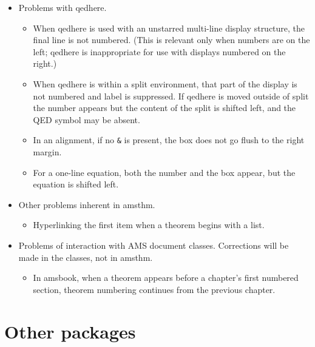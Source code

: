 \documentclass[11pt,twoside]{article}
\newcommand{\ntt}{%
  \fontfamily\ttdefault \fontseries\mddefault \fontshape\updefault
  \selectfont
}
\DeclareRobustCommand{\cn}[1]{{\ntt\bslchar#1}}
\DeclareRobustCommand{\cls}[1]{{\ntt#1}}
\DeclareRobustCommand{\pkg}[1]{{\ntt#1}}
\DeclareRobustCommand{\env}[1]{{\ntt#1}}
\begin{document}
\begin{itemize}
\item Problems with \cn{qedhere}. %
 \begin{itemize}
  \item When \cn{qedhere} is used with an unstarred multi-line display
    structure, the final line is not numbered.  (This is relevant only
    when numbers are on the left; \cn{qedhere} is inappropriate for
    use with displays numbered on the right.)
  \item When \cn{qedhere} is within a \env{split} environment, that
    part of the display is not numbered and \cn{label} is suppressed.
    If \cn{qedhere} is moved outside of \env{split} the number appears
    but the content of the \env{split} is shifted left, and the QED
    symbol may be absent.
  \item In an alignment, if no \verb+&+ is present, the box does not
    go flush to the right margin.
  \item For a one-line equation, both the number and the box appear,
    but the equation is shifted left.
 \end{itemize}
\item Other problems inherent in \pkg{amsthm}.
 \begin{itemize}
  \item Hyperlinking the first item when a theorem begins with a list.
 \end{itemize}
\item Problems of interaction with AMS document classes.  Corrections
  will be made in the classes, not in \pkg{amsthm}.
 \begin{itemize}
  \item In \cls{amsbook}, when a theorem appears before a chapter's
    first numbered section, theorem numbering continues from the
    previous chapter.
 \end{itemize}
\end{itemize}


\section{Other packages}
\end{document}
